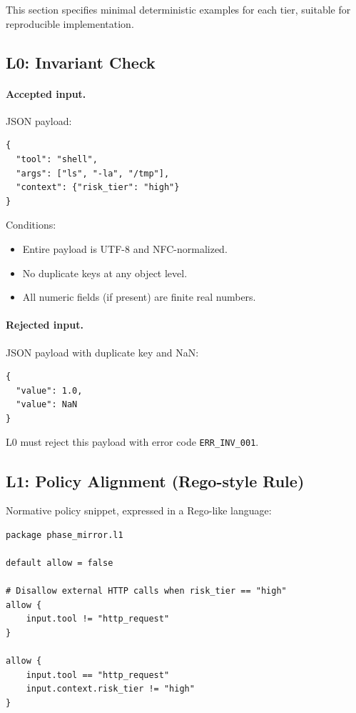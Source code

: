 \documentclass[11pt]{article}
\begin{document}
This section specifies minimal deterministic examples for each tier, suitable for reproducible implementation.

\subsection{L0: Invariant Check}

\paragraph{Accepted input.} JSON payload:

\begin{verbatim}
{
  "tool": "shell",
  "args": ["ls", "-la", "/tmp"],
  "context": {"risk_tier": "high"}
}
\end{verbatim}

Conditions:

\begin{itemize}
  \item Entire payload is UTF-8 and NFC-normalized.
  \item No duplicate keys at any object level.
  \item All numeric fields (if present) are finite real numbers.
\end{itemize}

\paragraph{Rejected input.} JSON payload with duplicate key and NaN:

\begin{verbatim}
{
  "value": 1.0,
  "value": NaN
}
\end{verbatim}

L0 must reject this payload with error code \texttt{ERR\_INV\_001}.

\subsection{L1: Policy Alignment (Rego-style Rule)}

Normative policy snippet, expressed in a Rego-like language:

\begin{verbatim}
package phase_mirror.l1

default allow = false

# Disallow external HTTP calls when risk_tier == "high"
allow {
    input.tool != "http_request"
}

allow {
    input.tool == "http_request"
    input.context.risk_tier != "high"
}
\end{verbatim}
\end{document}
